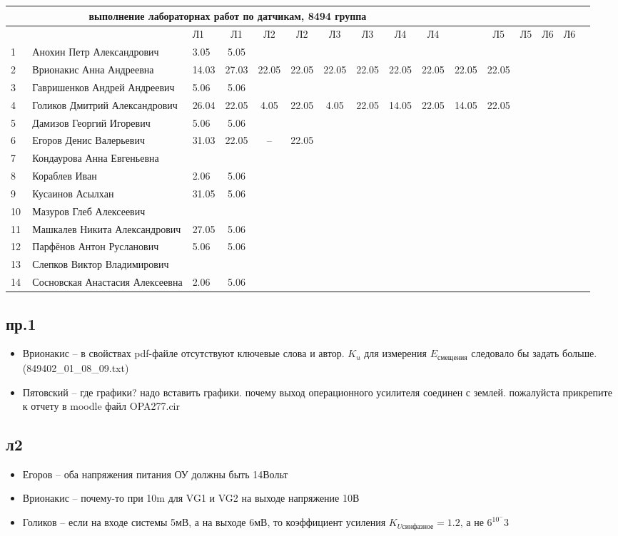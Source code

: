 \newpage
%
\begin{tabular}{l|llccccccccccccc}
\multicolumn{10}{c}{выполнение лабораторнах работ по датчикам, 8494 группа} \\
\toprule
&&Л1&Л1& Л2&Л2& Л3&Л3& Л4&Л4& &Л5&Л5& Л6&Л6\\
\midrule
1\,&   Анохин Петр Александрович       &3.05& 5.05&&&&&&\\
	2\,&   Врионакис Анна Андреевна        &14.03&27.03&22.05&22.05&22.05&22.05&22.05&22.05& 22.05&22.05\\
3\,&   Гавришенков Андрей Андреевич    &5.06& 5.06&&&&&&\\
	4\,&   Голиков Дмитрий Александрович   &26.04&22.05& 4.05 &22.05& 4.05 &22.05&14.05&22.05&14.05&22.05\\
5\,&   Дамизов Георгий Игоревич        & 5.06& 5.06&&&&&&\\
\midrule
6\,&   Егоров Денис Валерьевич         &31.03&22.05& --    & 22.05 &&&&\\
7\,&   Кондаурова Анна Евгеньевна      &&&&&&&&\\
8\,&   Кораблев Иван                   &2.06& 5.06&&&&&&\\
9\,&   Кусаинов Асылхан                &31.05& 5.06&&&&&&\\
10\,&  Мазуров Глеб Алексеевич         &&&&&&&&\\
\midrule
11\,&  Машкалев Никита Александрович   &27.05& 5.06&&&&&&\\
12\,&  Парфёнов Антон Русланович       &5.06 & 5.06&&&&&&\\
13\,&  Слепков Виктор Владимирович     &&&&&&&&\\
14\,&  Сосновская Анастасия Алексеевна & 2.06& 5.06&&&&&&\\
\bottomrule
\end{tabular}

\subsection*{пр.1}
\begin{itemize}
	\item Врионакис -- в свойствах pdf-файле отсутствуют ключевые слова и автор. $K_u$ для измерения $E_\text{смещения}$ следовало бы задать больше. (849402\_01\_08\_09.txt)
	\item Пятовский --
		где графики? надо вставить графики.
почему выход операционного усилителя соединен с землей.
пожалуйста прикрепите к отчету в moodle файл   OPA277.cir
\end{itemize}

\subsection{л2}
\begin{itemize}
\item Егоров -- оба напряжения питания ОУ должны быть 14Вольт
\item Врионакис -- почему-то при 10m для VG1 и VG2 на выходе напряжение 10В
\item Голиков -- если на входе системы 5мВ, а на выходе 6мВ, то коэффициент усиления $K_{U\text{синфазное}} = 1.2$, а не $6^10^-3$ 
\end{itemize}

